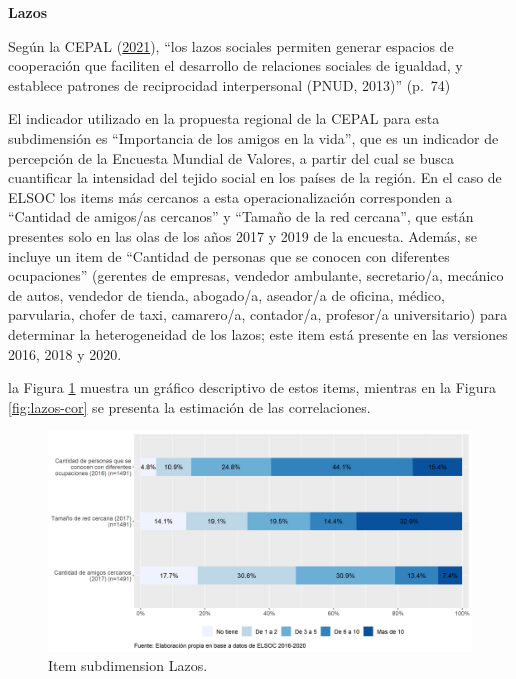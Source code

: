\documentclass[
  12pt,
]{book}
\begin{document}
\textbf{Lazos}

Según la CEPAL (\protect\hyperlink{ref-cepal_cohesion_2021}{2021}), ``los lazos sociales permiten generar espacios de cooperación que faciliten el desarrollo de relaciones sociales de igualdad, y establece patrones de reciprocidad interpersonal (PNUD, 2013)'' (p.~74)

El indicador utilizado en la propuesta regional de la CEPAL para esta subdimensión es ``Importancia de los amigos en la vida'', que es un indicador de percepción de la Encuesta Mundial de Valores, a partir del cual se busca cuantificar la intensidad del tejido social en los países de la región. En el caso de ELSOC los items más cercanos a esta operacionalización corresponden a ``Cantidad de amigos/as cercanos'' y ``Tamaño de la red cercana'', que están presentes solo en las olas de los años 2017 y 2019 de la encuesta. Además, se incluye un item de ``Cantidad de personas que se conocen con diferentes ocupaciones'' (gerentes de empresas, vendedor ambulante, secretario/a, mecánico de autos, vendedor de tienda, abogado/a, aseador/a de oficina, médico, parvularia, chofer de taxi, camarero/a, contador/a, profesor/a universitario) para determinar la heterogeneidad de los lazos; este item está presente en las versiones 2016, 2018 y 2020.

la Figura \ref{fig:lazos} muestra un gráfico descriptivo de estos items, mientras en la Figura \ref{fig:lazos-cor} se presenta la estimación de las correlaciones.

\begin{figure}[H]

{\centering \includegraphics[width=1\linewidth,height=1\textheight]{output/graphs/lazos} 

}

\caption{Item subdimension Lazos.}\label{fig:lazos}
\end{figure}
\end{document}
